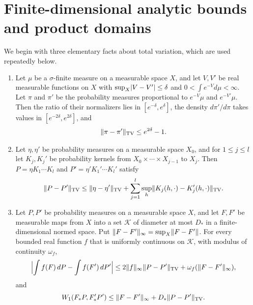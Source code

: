 \section{Finite-dimensional analytic bounds and product domains}\label{ch12:sec:analytic}

We begin with three elementary facts about total variation, which are used repeatedly below.

\begin{lemma}\label{ch12:lem:tv-tools}
\begin{enumerate}
\item Let $\mu$ be a $\sigma$-finite measure on a measurable space $X$, and let $V,V'$ be real measurable functions on $X$ with $\sup_X\lvert V-V'\rvert\le\delta$ and $0<\int e^{-V}d\mu<\infty$. Let $\pi$ and $\pi'$ be the probability measures proportional to $e^{-V}\mu$ and $e^{-V'}\mu$. Then the ratio of their normalizers lies in $[e^{-\delta},e^\delta]$, the density $d\pi'/d\pi$ takes values in $[e^{-2\delta},e^{2\delta}]$, and
\[
 \lVert \pi-\pi'\rVert_{\operatorname{TV}}\le e^{2\delta}-1 .
\]
\item Let $\eta,\eta'$ be probability measures on a measurable space $X_0$, and for $1\le j\le l$ let $K_j,K_j'$ be probability kernels from $X_0\times\cdots\times X_{j-1}$ to $X_j$. Then $P=\eta K_1\cdots K_l$ and $P'=\eta'K_1'\cdots K_l'$ satisfy
\[
 \lVert P-P'\rVert_{\operatorname{TV}}\le\lVert \eta-\eta'\rVert_{\operatorname{TV}}
 +\sum_{j=1}^l\sup_h\lVert K_j(h,\cdot)-K_j'(h,\cdot)\rVert_{\operatorname{TV}}.
\]
\item Let $P,P'$ be probability measures on a measurable space $X$, and let $F,F'$ be measurable maps from $X$ into a set $\mathcal K$ of diameter at most $D_*$ in a finite-dimensional normed space. Put $\lVert F-F'\rVert_\infty=\sup_X\lVert F-F'\rVert$. For every bounded real function $f$ that is uniformly continuous on $\mathcal K$, with modulus of continuity $\omega_f$,
\[
 \Bigl\lvert\int f(F)\,dP-\int f(F')\,dP'\Bigr\rvert
 \le2\lVert f\rVert_\infty\lVert P-P'\rVert_{\operatorname{TV}}+\omega_f(\lVert F-F'\rVert_\infty),
\]
and
\[
 W_1(F_*P,F'_*P')\le\lVert F-F'\rVert_\infty+D_*\lVert P-P'\rVert_{\operatorname{TV}}.
\]
\end{enumerate}
\end{lemma}

